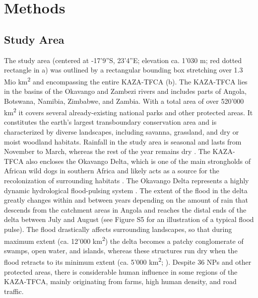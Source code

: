 \documentclass[abstract=on,10pt,a4paper,bibliography=totocnumbered]{article}
\begin{document}
\section{Methods}
\subsection{Study Area}
The study area (centered at -17'9''S, 23'4''E; elevation ca.
1'030 m; red dotted rectangle in a) was outlined by a
rectangular bounding box stretching over 1.3 Mio km\textsuperscript{2} and
encompassing the entire KAZA-TFCA (b). The KAZA-TFCA lies in the
basins of the Okavango and Zambezi rivers and includes parts of Angola,
Botswana, Namibia, Zimbabwe, and Zambia. With a total area of over 520'000
km\textsuperscript{2} it covers several already-existing national parks and
other protected areas. It constitutes the earth's largest transboundary
conservation area and is characterized by diverse landscapes, including savanna,
grassland, and dry or moist woodland habitats. Rainfall in the study area is
seasonal and lasts from November to March, whereas the rest of the year remains
dry \citep{Mendelsohn.2010}. The KAZA-TFCA also encloses the Okavango Delta,
which is one of the main strongholds of African wild dogs in southern Africa and
likely acts as a source for the recolonization of surrounding habitats
\citep{Woodroffe.2012}. The Okavango Delta represents a highly dynamic
hydrological flood-pulsing system \citep{McNutt.1996, Wolski.2017}. The extent
of the flood in the delta greatly changes within and between years depending on
the amount of rain that descends from the catchment areas in Angola and reaches
the distal ends of the delta between July and August (see Figure S5 for an
illustration of a typical flood pulse). The flood drastically affects
surrounding landscapes, so that during maximum extent (ca. 12'000
km\textsuperscript{2}) the delta becomes a patchy conglomerate of swamps, open
water, and islands, whereas these structures run dry when the flood retracts to
its minimum extent (ca. 5'000 km\textsuperscript{2}; \citealp{Gumbricht.2004,
Wolski.2017, McCarthy.1998}). Despite 36 NPs and other protected areas, there is
considerable human influence in some regions of the KAZA-TFCA, mainly
originating from farms, high human density, and road traffic.
\end{document}
